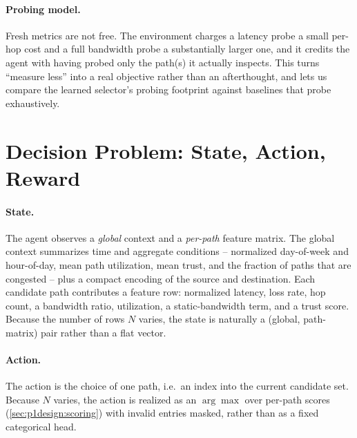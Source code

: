 \paragraph{Probing model.} Fresh metrics are not free. The environment charges a latency probe a small
per-hop cost and a full bandwidth probe a substantially larger one, and it credits the agent with
having probed only the path(s) it actually inspects. This turns ``measure less'' into a real objective
rather than an afterthought, and lets us compare the learned selector's probing footprint against
baselines that probe exhaustively.

\section{Decision Problem: State, Action, Reward}
\label{sec:p1design:mdp}

\paragraph{State.} The agent observes a \emph{global} context and a \emph{per-path} feature matrix. The
global context summarizes time and aggregate conditions -- normalized day-of-week and hour-of-day, mean
path utilization, mean trust, and the fraction of paths that are congested -- plus a compact encoding of
the source and destination. Each candidate path contributes a feature row: normalized latency, loss
rate, hop count, a bandwidth ratio, utilization, a static-bandwidth term, and a trust score. Because the
number of rows $N$ varies, the state is naturally a (global, path-matrix) pair rather than a flat
vector.

\paragraph{Action.} The action is the choice of one path, i.e.\ an index into the current candidate set.
Because $N$ varies, the action is realized as an $\arg\max$ over per-path scores (\cref{sec:p1design:scoring})
with invalid entries masked, rather than as a fixed categorical head.

